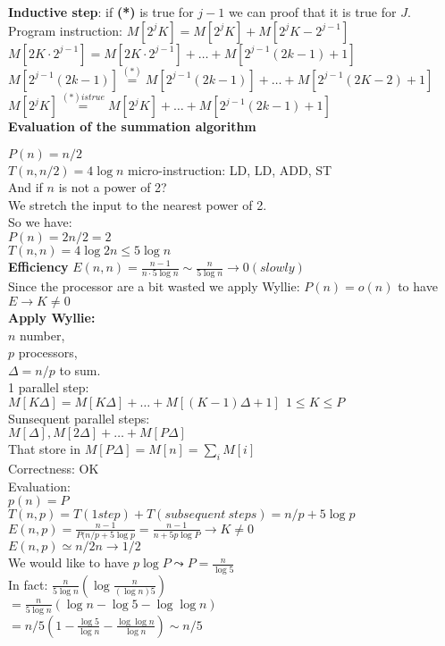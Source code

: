 \textbf{Inductive step}: if \textbf{(*)} is true for $j-1$ we can proof that it is true for $J$.\\
Program instruction: $M[2^{j}K] = M[2^{j}K] + M[2^{j}K - 2^{j-1}]$\\
$M[2K \cdot 2^{j-1}] = M[2K \cdot 2^{j-1}] + \dots + M[2^{j-1}(2k-1)+1]$\\
$M[2^{j-1}(2k-1)] \overset{(*)}{=} M[2^{j-1}(2k-1)] + \dots + M[2^{j-1}(2K-2)+1]$\\
$M[2^{j}K] \overset{(*) is true}{=} M[2^{j}K] + \dots + M[2^{j-1}(2k-1)+1]$\\

\textbf{Evaluation of the summation algorithm}

$P(n) = n/2$\\
$T(n, n/2) = 4 \log{n}$ micro-instruction: LD, LD, ADD, ST\\
And if $n$ is not a power of 2?\\
We stretch the input to the nearest power of 2.\\
So we have:\\ 
$P(n) = 2n/2 = 2$\\
$T(n, n) = 4 \log{2n} \leq 5 \log{n}$ \\

\textbf{Efficiency}
$E(n,n) = \frac{n-1}{n \cdot 5 \log{n}} \sim \frac{n}{5 \log{n}} \rightarrow 0 (slowly)$\\
Since the processor are a bit wasted we apply Wyllie: $P(n) = o(n)$ to have $E \rightarrow K \neq 0$\\

\textbf{Apply Wyllie:}\\
$n$ number,\\
$p$ processors,\\
$\Delta = n/p$ to sum.\\

1 parallel step:\\
$M[K \Delta] = M[K \Delta] + \dots + M[(K-1) \Delta+1] \ \ 1 \leq K \leq P$\\
Sunsequent parallel steps:\\
$M[\Delta], M[2 \Delta] + \dots + M[P \Delta]$\\
That store in $M[P \Delta] = M[n] = \sum_i{M[i]}$\\
Correctness: OK\\
Evaluation:\\
$p(n) = P$\\
$T(n, p) = T(1 step) + T(subsequent \ steps) = n/p + 5 \log{p}$\\
$E(n,p) = \frac{n-1}{P(n/p + 5 \log{p}} = \frac{n-1}{n + 5p \log{P}} \rightarrow K \neq 0$\\
$E(n,p) \simeq n/2n \rightarrow 1/2$\\
We would like to have $p \log{P} \leadsto P = \frac{n}{\log{5}}$\\
In fact: $\frac{n}{5 \log{n}} \left(\log{\frac{n}{(\log{n})5}}\right)$\\
$ = \frac{n}{5 \log{n}}\left(\log{n} - \log{5} - \log{\log{n}}\right)$\\
$ = n/5\left(1 - \frac{\log{5}}{\log{n}} - \frac{\log{\log{n}}}{\log{n}}\right) \sim n/5$\\

